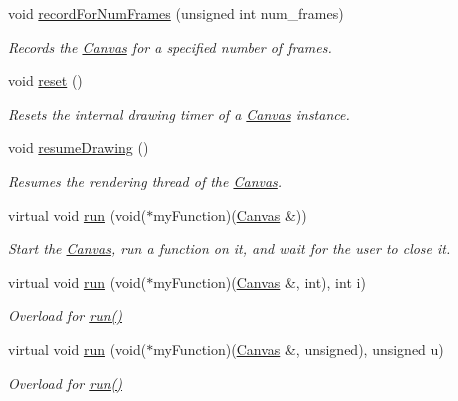 \begin{DoxyCompactItemize}
void \hyperlink{classtsgl_1_1_canvas_a47436daa39473ddb4044bac7b3b27151}{record\-For\-Num\-Frames} (unsigned int num\-\_\-frames)
\begin{DoxyCompactList}\small\item\em Records the \hyperlink{classtsgl_1_1_canvas}{Canvas} for a specified number of frames. \end{DoxyCompactList}\item 
void \hyperlink{classtsgl_1_1_canvas_ada6403439b583910d27e497148da5f2e}{reset} ()
\begin{DoxyCompactList}\small\item\em Resets the internal drawing timer of a \hyperlink{classtsgl_1_1_canvas}{Canvas} instance. \end{DoxyCompactList}\item 
void \hyperlink{classtsgl_1_1_canvas_a56bf3c6e4eb7b06015d1c115aaa143f8}{resume\-Drawing} ()
\begin{DoxyCompactList}\small\item\em Resumes the rendering thread of the \hyperlink{classtsgl_1_1_canvas}{Canvas}. \end{DoxyCompactList}\item 
virtual void \hyperlink{classtsgl_1_1_canvas_a5f3f00d6c380a662a239077456045502}{run} (void($\ast$my\-Function)(\hyperlink{classtsgl_1_1_canvas}{Canvas} \&))
\begin{DoxyCompactList}\small\item\em Start the \hyperlink{classtsgl_1_1_canvas}{Canvas}, run a function on it, and wait for the user to close it. \end{DoxyCompactList}\item 
virtual void \hyperlink{classtsgl_1_1_canvas_a62ec8be88bea1905cdb6855138ef3cb1}{run} (void($\ast$my\-Function)(\hyperlink{classtsgl_1_1_canvas}{Canvas} \&, int), int i)
\begin{DoxyCompactList}\small\item\em Overload for \hyperlink{classtsgl_1_1_canvas_a5f3f00d6c380a662a239077456045502}{run()} \end{DoxyCompactList}\item 
virtual void \hyperlink{classtsgl_1_1_canvas_a67b341ead1fde0a692281d2b1f67be1e}{run} (void($\ast$my\-Function)(\hyperlink{classtsgl_1_1_canvas}{Canvas} \&, unsigned), unsigned u)
\begin{DoxyCompactList}\small\item\em Overload for \hyperlink{classtsgl_1_1_canvas_a5f3f00d6c380a662a239077456045502}{run()} \end{DoxyCompactList}\item 

\end{DoxyCompactItemize}
